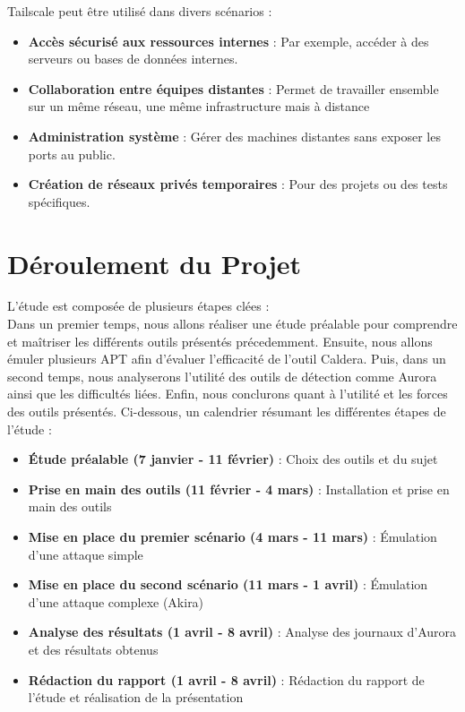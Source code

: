\documentclass[12pt,letterpaper]{article}
\begin{document}
Tailscale peut être utilisé dans divers scénarios :
\begin{itemize}
    \item \textbf{Accès sécurisé aux ressources internes} : Par exemple, accéder à des serveurs ou bases de données internes.
    \item \textbf{Collaboration entre équipes distantes} : Permet de travailler ensemble sur un même réseau, une même infrastructure mais à distance
    \item \textbf{Administration système} : Gérer des machines distantes sans exposer les ports au public.
    \item \textbf{Création de réseaux privés temporaires} : Pour des projets ou des tests spécifiques.
\end{itemize}

\newpage
\section{Déroulement du Projet}

L'étude est composée de plusieurs étapes clées : \\
Dans un premier temps, nous allons réaliser une étude préalable pour comprendre et maîtriser les différents outils présentés précedemment.
Ensuite, nous allons émuler plusieurs APT afin d'évaluer l'efficacité de l'outil Caldera.
Puis, dans un second temps, nous analyserons l'utilité des outils de détection comme Aurora ainsi que les difficultés liées.
Enfin, nous conclurons quant à l'utilité et les forces des outils présentés.
Ci-dessous, un calendrier résumant les différentes étapes de l'étude :
\begin{itemize}
    \item \textbf{Étude préalable (7 janvier - 11 février)} : Choix des outils et du sujet
    \item \textbf{Prise en main des outils (11 février - 4 mars)} : Installation et prise en main des outils
    \item \textbf{Mise en place du premier scénario (4 mars - 11 mars)} : Émulation d'une attaque simple
    \item \textbf{Mise en place du second scénario (11 mars - 1 avril)} : Émulation d'une attaque complexe (Akira)
    \item \textbf{Analyse des résultats (1 avril - 8 avril)} : Analyse des journaux d'Aurora et des résultats obtenus
    \item \textbf{Rédaction du rapport (1 avril - 8 avril)} : Rédaction du rapport de l'étude et réalisation de la présentation
\end{itemize}
\end{document}
